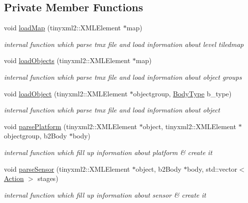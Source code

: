 \subsection*{Private Member Functions}
\begin{DoxyCompactItemize}
\item 
void \hyperlink{class_level_ac95aee215b31865a7f010d077e9e59b8}{load\+Map} (tinyxml2\+::\+X\+M\+L\+Element $\ast$map)
\begin{DoxyCompactList}\small\item\em internal function which parse tmx file and load information about level tiledmap \end{DoxyCompactList}\item 
void \hyperlink{class_level_a366a0ac7ecbca8e3fa56d8e271d155a9}{load\+Objects} (tinyxml2\+::\+X\+M\+L\+Element $\ast$map)
\begin{DoxyCompactList}\small\item\em internal function which parse tmx file and load information about object groups \end{DoxyCompactList}\item 
void \hyperlink{class_level_a69835ba3b93667d000f1bd7feece7217}{load\+Object} (tinyxml2\+::\+X\+M\+L\+Element $\ast$objectgroup, \hyperlink{_level_8h_acf0ce63e34327e5bc336f9fe3d2d47a2}{Body\+Type} b\+\_\+type)
\begin{DoxyCompactList}\small\item\em internal function which parse tmx file and load information about object \end{DoxyCompactList}\item 
void \hyperlink{class_level_a2d4fd0491266cd6635edeb1f9b24d373}{parse\+Platform} (tinyxml2\+::\+X\+M\+L\+Element $\ast$object, tinyxml2\+::\+X\+M\+L\+Element $\ast$objectgroup, b2\+Body $\ast$body)
\begin{DoxyCompactList}\small\item\em internal function which fill up information about platform \& create it \end{DoxyCompactList}\item 
void \hyperlink{class_level_afe367884e3e0e7e1ca1870566eababd8}{parse\+Sensor} (tinyxml2\+::\+X\+M\+L\+Element $\ast$object, b2\+Body $\ast$body, std\+::vector$<$ \hyperlink{_manual_switch_obj_8h_a8bb1ef53467e4f61410d12822d922498}{Action} $>$ stages)
\begin{DoxyCompactList}\small\item\em internal function which fill up information about sensor \& create it \end{DoxyCompactList}\item 

\end{DoxyCompactItemize}
